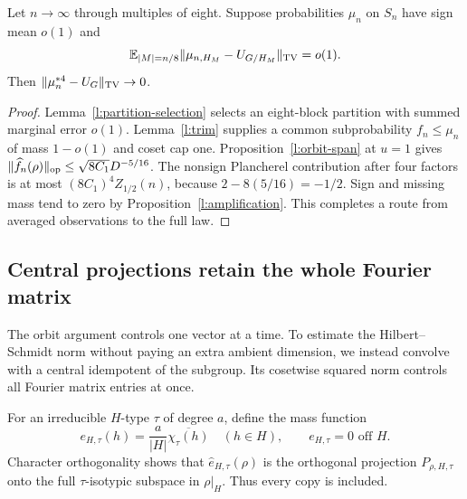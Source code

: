 \begin{corollary}\label{l:orbit-completion}\label{l:eight-convolutions}
Let $n\to\infty$ through multiples of eight. Suppose probabilities $\mu_n$ on $S_n$ have sign mean $o(1)$ and
\[
 \mathbb E_{|M|=n/8}\|\mu_{n,H_M}-U_{G/H_M}\|_{\mathrm{TV}}=o(1).
\]
Then $\|\mu_n^{*4}-U_G\|_{\mathrm{TV}}\to0$.
\end{corollary}
\begin{proof}
Lemma~\ref{l:partition-selection} selects an eight-block partition with summed marginal error $o(1)$. Lemma~\ref{l:trim} supplies a common subprobability $f_n\le\mu_n$ of mass $1-o(1)$ and coset cap one. Proposition~\ref{l:orbit-span} at $u=1$ gives $\|\widehat f_n(\rho)\|_{\mathrm{op}}\le\sqrt{8C_1}D^{-5/16}$. The nonsign Plancherel contribution after four factors is at most $(8C_1)^4 Z_{1/2}(n)$, because $2-8(5/16)=-1/2$. Sign and missing mass tend to zero by Proposition~\ref{l:amplification}. This completes a route from averaged observations to the full law.
\end{proof}

\subsection{Central projections retain the whole Fourier matrix}

The orbit argument controls one vector at a time. To estimate the
Hilbert--Schmidt norm without paying an extra ambient dimension, we
instead convolve with a central idempotent of the subgroup. Its
cosetwise squared norm controls all Fourier matrix entries at once.

For an irreducible $H$-type $\tau$ of degree $a$, define the mass function
\[
 e_{H,\tau}(h)=\frac{a}{|H|}\overline{\chi_\tau(h)}\quad(h\in H),\qquad e_{H,\tau}=0\text{ off }H.
\]
Character orthogonality shows that $\widehat e_{H,\tau}(\rho)$ is the orthogonal projection $P_{\rho,H,\tau}$ onto the full $\tau$-isotypic subspace in $\rho|_H$. Thus every copy is included.

